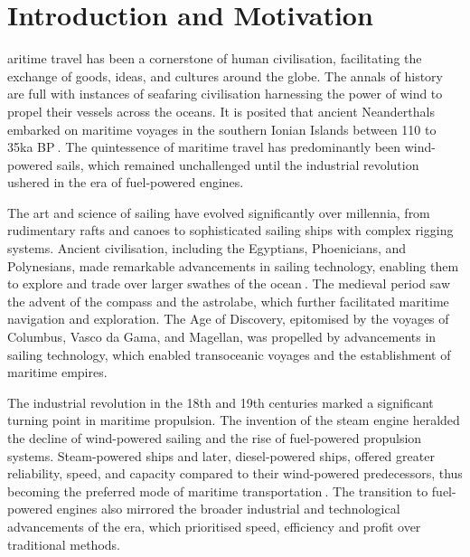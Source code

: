 \let\textcircled=\pgftextcircled
\chapter{Introduction and Motivation}\label{chap:intro}

aritime travel has been a cornerstone of human civilisation, facilitating the exchange of goods, ideas, and cultures around the globe. The annals of history are full with instances of seafaring civilisation harnessing the power of wind to propel their vessels across the oceans. It is posited that ancient Neanderthals embarked on maritime voyages in the southern Ionian Islands between 110 to 35ka BP$~$\cite{Ferentinos2012}. The quintessence of maritime travel has predominantly been wind-powered sails, which remained unchallenged until the industrial revolution ushered in the era of fuel-powered engines.

The art and science of sailing have evolved significantly over millennia, from rudimentary rafts and canoes to sophisticated sailing ships with complex rigging systems. Ancient civilisation, including the Egyptians, Phoenicians, and Polynesians, made remarkable advancements in sailing technology, enabling them to explore and trade over larger swathes of the ocean$~$\cite{casson1995ships}. The medieval period saw the advent of the compass and the astrolabe, which further facilitated maritime navigation and exploration. The Age of Discovery, epitomised by the voyages of Columbus, Vasco da Gama, and Magellan, was propelled by advancements in sailing technology, which enabled transoceanic voyages and the establishment of maritime empires.

The industrial revolution in the 18th and 19th centuries marked a significant turning point in maritime propulsion. The invention of the steam engine heralded the decline of wind-powered sailing and the rise of fuel-powered propulsion systems. Steam-powered ships and later, diesel-powered ships, offered greater reliability, speed, and capacity compared to their wind-powered predecessors, thus becoming the preferred mode of maritime transportation$~$\cite{gardiner1993advent}. The transition to fuel-powered engines also mirrored the broader industrial and technological advancements of the era, which prioritised speed, efficiency and profit over traditional methods.

